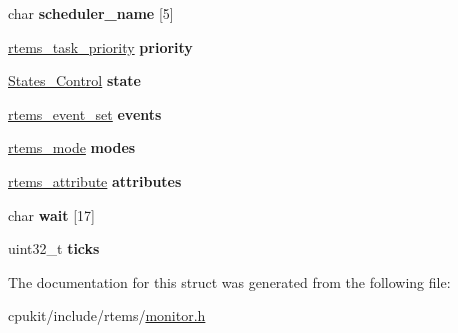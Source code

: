 \begin{DoxyCompactItemize}
char {\bfseries scheduler\+\_\+name} \mbox{[}5\mbox{]}
\item 
\mbox{\label{structrtems__monitor__task__t_af5850d48a9033ce9fca41d1a987ab27e}} 
\mbox{\hyperlink{group__ClassicTasks_gaa80a0c0938307d1e99d0eb5fee765b47}{rtems\+\_\+task\+\_\+priority}} {\bfseries priority}
\item 
\mbox{\label{structrtems__monitor__task__t_a7aa68690a3bbe5f4be5b2cd5223f7e1b}} 
\mbox{\hyperlink{group__RTEMSScoreStates_gaeebbea0bfca162709b124fd519cf99d3}{States\+\_\+\+Control}} {\bfseries state}
\item 
\mbox{\label{structrtems__monitor__task__t_a3f41ea80df8925c8cdac602f9c8b8267}} 
\mbox{\hyperlink{group__ClassicEventSet_gab7b8f373bea85fd4e3b7ae23905faa07}{rtems\+\_\+event\+\_\+set}} {\bfseries events}
\item 
\mbox{\label{structrtems__monitor__task__t_af4e154af4d8e592eb3e087b643eebf18}} 
\mbox{\hyperlink{group__ClassicModes_ga8d46a41a837840dc97336fdcd20e4f68}{rtems\+\_\+mode}} {\bfseries modes}
\item 
\mbox{\label{structrtems__monitor__task__t_a084629c4f3cf62c3abdb166d121bea25}} 
\mbox{\hyperlink{group__ClassicAttributes_gaea40313cf78ed843e09c4315d0a10f79}{rtems\+\_\+attribute}} {\bfseries attributes}
\item 
\mbox{\label{structrtems__monitor__task__t_a29fa245c67f1ce5a078e84b828061913}} 
char {\bfseries wait} \mbox{[}17\mbox{]}
\item 
\mbox{\label{structrtems__monitor__task__t_a342334bff5848a30b8372c3aad942086}} 
uint32\+\_\+t {\bfseries ticks}
\end{DoxyCompactItemize}


The documentation for this struct was generated from the following file\+:\begin{DoxyCompactItemize}
\item 
cpukit/include/rtems/\mbox{\hyperlink{monitor_8h}{monitor.\+h}}\end{DoxyCompactItemize}

